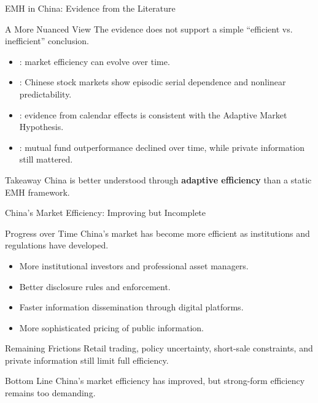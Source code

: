 \begin{frame}{EMH in China: Evidence from the Literature}

\begin{block}{A More Nuanced View}
The evidence does not support a simple ``efficient vs. inefficient'' conclusion.
\end{block}

\vspace{0.2cm}

\begin{itemize}
    \item \textcite{lim2011evolution}: market efficiency can evolve over time.

    \item \textcite{lim2009weak}: Chinese stock markets show episodic serial dependence and nonlinear predictability.

    \item \textcite{xiong2019adaptive}: evidence from calendar effects is consistent with the Adaptive Market Hypothesis.

    \item \textcite{chi2013china}: mutual fund outperformance declined over time, while private information still mattered.
\end{itemize}

\vfill

\begin{alertblock}{Takeaway}
China is better understood through \textbf{adaptive efficiency} than a static EMH framework.
\end{alertblock}

\end{frame}

\begin{frame}{China's Market Efficiency: Improving but Incomplete}
\footnotesize
\begin{block}{Progress over Time}
China's market has become more efficient as institutions and regulations have developed.
\end{block}


\begin{itemize}
    \item More institutional investors and professional asset managers.
    \item Better disclosure rules and enforcement.
    \item Faster information dissemination through digital platforms.
    \item More sophisticated pricing of public information.
\end{itemize}


\begin{block}{Remaining Frictions}
Retail trading, policy uncertainty, short-sale constraints, and private information still limit full efficiency.
\end{block}

\vfill

\begin{alertblock}{Bottom Line}
China's market efficiency has improved, but strong-form efficiency remains too demanding.
\end{alertblock}

\end{frame}

